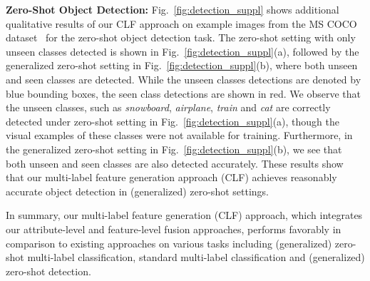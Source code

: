\documentclass[10pt,journal,compsoc]{IEEEtran}
\begin{document}
\noindent\textbf{Zero-Shot Object Detection:} Fig.~\ref{fig:detection_suppl} shows additional qualitative results of our CLF approach on example images from the MS COCO dataset~\cite{coco} for the zero-shot object detection task. The zero-shot setting with only unseen classes detected is shown in Fig.~\ref{fig:detection_suppl}(a), followed by the generalized zero-shot setting in Fig.~\ref{fig:detection_suppl}(b), where both unseen and seen classes are detected. While the unseen classes detections are denoted by blue bounding boxes, the seen class detections are shown in red. We observe that the unseen classes, such as \textit{snowboard}, \textit{airplane}, \textit{train} and \textit{cat} are correctly detected under zero-shot setting in Fig.~\ref{fig:detection_suppl}(a), though the visual examples of these classes were not available for training. Furthermore, in the generalized zero-shot setting in Fig.~\ref{fig:detection_suppl}(b), we see that both unseen and seen classes are also detected accurately. These results show that our multi-label feature generation approach (CLF) achieves reasonably accurate object detection in (generalized) zero-shot settings. 














In summary, our multi-label feature generation (CLF) approach, which integrates our attribute-level and feature-level fusion approaches, performs favorably in comparison to existing approaches on various tasks including (generalized) zero-shot multi-label classification, standard multi-label classification and (generalized) zero-shot detection. 
\end{document}
